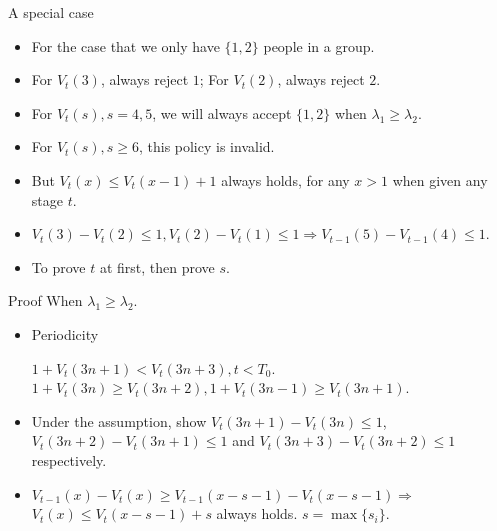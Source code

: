     \begin{frame}{A special case}
      \begin{itemize}
        \item For the case that we only have $\{1,2\}$ people in a group.
        \item For $V_t(3)$, always reject $1$; For $V_t(2)$, always reject $2$.
        \item For $V_t(s), s=4,5$, we will always accept $\{1,2\}$ when $\lambda_1 \geq \lambda_2$.
        \item For $V_t(s), s \geq 6$, this policy is invalid.
        \item But $V_t(x) \leq V_t(x-1) +1$ always holds, for any $x>1$ when given any stage $t$.
        \item $V_t(3) - V_t(2) \leq 1, V_t(2) - V_t(1) \leq 1 \Rightarrow V_{t-1}(5) - V_{t-1}(4) \leq 1$.
        \item To prove $t$ at first, then prove $s$.
      \end{itemize}
    \end{frame}

    \begin{frame}{Proof}
      When $\lambda_1 \geq \lambda_2$.
      \begin{itemize}
        \item Periodicity

        $1 + V_t(3n+1) < V_t(3n+3), t<T_0.$
        $1 + V_t(3n) \geq V_t(3n+2), 1 + V_t(3n-1) \geq V_t(3n+1)$.

        \item Under the assumption, show $V_t(3n+1)-V_t(3n) \leq 1$, $V_t(3n+2)-V_t(3n+1) \leq 1$ and $V_t(3n+3)-V_t(3n+2) \leq 1$ respectively.

        \item $V_{t-1}(x) - V_{t}(x)\geq V_{t-1}(x-s-1) - V_{t}(x-s-1) \Rightarrow$
        $V_t(x) \leq V_t(x-s-1) +s$ always holds. $s = \max\{s_i\}$.
      \end{itemize}
    \end{frame}

